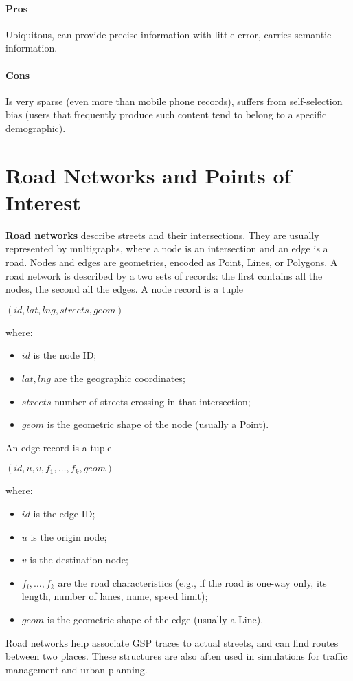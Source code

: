 \paragraph{Pros}
Ubiquitous, can provide precise information with little error, carries semantic information.

\paragraph{Cons}
Is very sparse (even more than mobile phone records), suffers from self-selection bias (users that frequently produce such content tend to belong to a specific demographic).

\section{Road Networks and Points of Interest}

\textbf{Road networks} describe streets and their intersections. They are usually represented by multigraphs, where a node is an intersection and an edge is a road. Nodes and edges are geometries, encoded as Point, Lines, or Polygons. A road network is described by a two sets of records: the first contains all the nodes, the second all the edges. A node record is a tuple
\begin{center}
    $(id, lat, lng, streets, geom)$
\end{center}
where:
\begin{itemize}[itemsep=-5pt, label=-]
    \item $id$ is the node ID;
    \item $lat, lng$ are the geographic coordinates;
    \item $streets$ number of streets crossing in that intersection;
    \item $geom$ is the geometric shape of the node (usually a Point).
\end{itemize}
An edge record is a tuple
\begin{center}
    $(id, u, v, f_1, \dots, f_k, geom)$
\end{center}
where:
\begin{itemize}[itemsep=-5pt, label=-]
    \item $id$ is the edge ID;
    \item $u$ is the origin node;
    \item $v$ is the destination node;
    \item $f_i, \dots, f_k$ are the road characteristics (e.g., if the road is one-way only, its length, number of lanes, name, speed limit);
    \item $geom$ is the geometric shape of the edge (usually a Line).
\end{itemize}
Road networks help associate GSP traces to actual streets, and can find routes between two places. These structures are also aften used in simulations for traffic management and urban planning.

